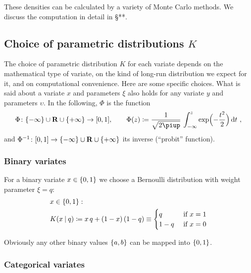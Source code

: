 \documentclass[\ifafour a4paper,12pt,\else a5paper,10pt,\fi%
onecolumn,oneside,article,%
british%
]{memoir}
\theoremstyle{remark}
\theoremstyle{innote}
\newcommand*{\pu}{\piup}%
\newcommand*{\di}{\mathrm{d}}%
\newcommand*{\RR}{\bm{\mathrm{R}}}
\newcommand*{\defd}{\coloneqq}
\DeclarePairedDelimiter\clcl{[}{]}
\DeclarePairedDelimiter\set{\{}{\}} %
\renewcommand*{\|}[1][]{\nonscript\:#1\vert\nonscript\:\mathopen{}}
\newcommand*{\sect}{\S}%
\begin{document}
These densities can be calculated by a variety of Monte Carlo methods. We discuss the computation in detail in \sect***.

\subsection{Choice of parametric distributions $K$}
\label{sec:choice_K}

The choice of parametric distribution $K$ for each variate depends on the mathematical type of variate, on the kind of long-run distribution we expect for it, and on computational convenience. Here are some specific choices. What is said about a variate $x$ and parameters $\xi$ also holds for any variate $y$ and parameters $\upsilon$. In the following, $\Phi$ is the function
\begin{equation}
  \label{eq:Phi}
  \Phi \colon  \set{-\infty}\cup\RR\cup\set{+\infty}\to\clcl{0,1},
  \qquad
  \Phi(z) \defd \frac{1}{\sqrt{2\pu}}\, \int_{-\infty}^{z} \exp\Bigl(-\frac{t^{2}}{2}\Bigr)\, \di t \ ,
\end{equation}
and $\Phi^{-1}\colon \clcl{0,1}\to\set{-\infty}\cup\RR\cup\set{+\infty}$ its inverse (\enquote{probit} function).



\subsubsection{Binary variates}
\label{sec:variates_binary}

For a binary variate $x \in \set{0,1}$ we choose a Bernoulli distribution with weight parameter $\xi=q$:
\begin{equation}
  \label{eq:K_bin}
  \begin{split}
    &x \in \set{0,1}:
\\
    &K(x \| q) \defd x\, q + (1-x)\,(1-q) \equiv
  \begin{cases}
    q&\text{ if $x=1$} \\1-q&\text{ if $x=0$}
  \end{cases}
\end{split}
\end{equation}

Obviously any other binary values $\set{a,b}$ can be mapped into $\set{0,1}$.

\subsubsection{Categorical variates}
\label{sec:variates_categorical}
\end{document}
